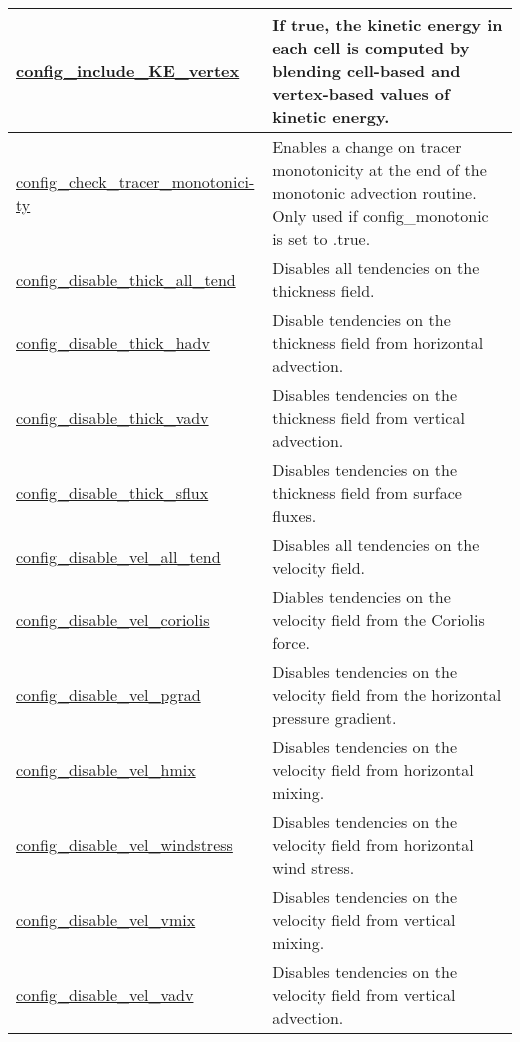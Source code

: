 {\begin{center}
\begin{longtable}{| p{2.0in} || p{4.0in} |}
	\hline
	\hyperref[sec:nm_sec_config_include_KE_vertex]{config\_include\_KE\_vertex} & If true, the kinetic energy in each cell is computed by blending cell-based and vertex-based values of kinetic energy. \\
	\hline
	\hyperref[sec:nm_sec_config_check_tracer_monotonicity]{config\_check\_tracer\_monotonici-}\hyperref[sec:nm_sec_config_check_tracer_monotonicity]{ty}& Enables a change on tracer monotonicity at the end of the monotonic advection routine. Only used if config\_monotonic is set to .true. \\
	\hline
	\hyperref[sec:nm_sec_config_disable_thick_all_tend]{config\_disable\_thick\_all\_tend} & Disables all tendencies on the thickness field. \\
	\hline
	\hyperref[sec:nm_sec_config_disable_thick_hadv]{config\_disable\_thick\_hadv} & Disable tendencies on the thickness field from horizontal advection. \\
	\hline
	\hyperref[sec:nm_sec_config_disable_thick_vadv]{config\_disable\_thick\_vadv} & Disables tendencies on the thickness field from vertical advection. \\
	\hline
	\hyperref[sec:nm_sec_config_disable_thick_sflux]{config\_disable\_thick\_sflux} & Disables tendencies on the thickness field from surface fluxes. \\
	\hline
	\hyperref[sec:nm_sec_config_disable_vel_all_tend]{config\_disable\_vel\_all\_tend} & Disables all tendencies on the velocity field. \\
	\hline
	\hyperref[sec:nm_sec_config_disable_vel_coriolis]{config\_disable\_vel\_coriolis} & Diables tendencies on the velocity field from the Coriolis force. \\
	\hline
	\hyperref[sec:nm_sec_config_disable_vel_pgrad]{config\_disable\_vel\_pgrad} & Disables tendencies on the velocity field from the horizontal pressure gradient. \\
	\hline
	\hyperref[sec:nm_sec_config_disable_vel_hmix]{config\_disable\_vel\_hmix} & Disables tendencies on the velocity field from horizontal mixing. \\
	\hline
	\hyperref[sec:nm_sec_config_disable_vel_windstress]{config\_disable\_vel\_windstress} & Disables tendencies on the velocity field from horizontal wind stress. \\
	\hline
	\hyperref[sec:nm_sec_config_disable_vel_vmix]{config\_disable\_vel\_vmix} & Disables tendencies on the velocity field from vertical mixing. \\
	\hline
	\hyperref[sec:nm_sec_config_disable_vel_vadv]{config\_disable\_vel\_vadv} & Disables tendencies on the velocity field from vertical advection. \\

\end{longtable}
\end{center}}
